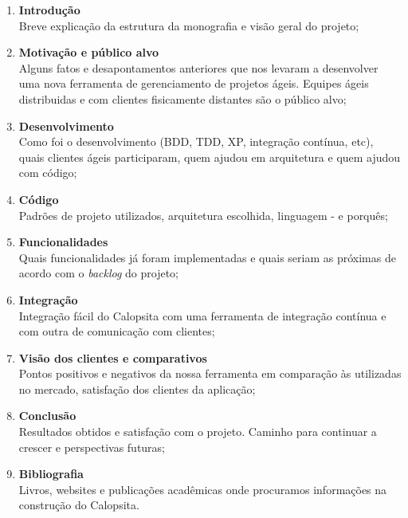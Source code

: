 \documentclass[titlepage]{article}
\begin{document}
\begin{enumerate}
	\item{\textbf{Introdução} \\ Breve explicação da estrutura da monografia e visão geral do projeto;}
	\item{\textbf{Motivação e público alvo} \\ Alguns fatos e desapontamentos anteriores que nos levaram a desenvolver uma nova ferramenta de gerenciamento de projetos ágeis. Equipes ágeis distribuidas e com clientes fisicamente distantes são o público alvo;}
	\item{\textbf{Desenvolvimento} \\ Como foi o desenvolvimento (BDD, TDD, XP, integração contínua, etc), quais clientes ágeis participaram, quem ajudou em arquitetura e quem ajudou com código;}
	\item{\textbf{Código} \\ Padrões de projeto utilizados, arquitetura escolhida, linguagem - e porquês;}
	\item{\textbf{Funcionalidades} \\ Quais funcionalidades já foram implementadas e quais seriam as próximas de acordo com o \textit{backlog} do projeto;}
	\item{\textbf{Integração} \\ Integração fácil do Calopsita com uma ferramenta de integração contínua e com outra de comunicação com clientes;}
	\item{\textbf{Visão dos clientes e comparativos} \\ Pontos positivos e negativos da nossa ferramenta em comparação às utilizadas no mercado, satisfação dos clientes da aplicação;}
	\item{\textbf{Conclusão} \\ Resultados obtidos e satisfação com o projeto. Caminho para continuar a crescer e perspectivas futuras;}
	\item{\textbf{Bibliografia} \\ Livros, websites e publicações acadêmicas onde procuramos informações na construção do Calopsita.}
\end{enumerate}
\end{document}
